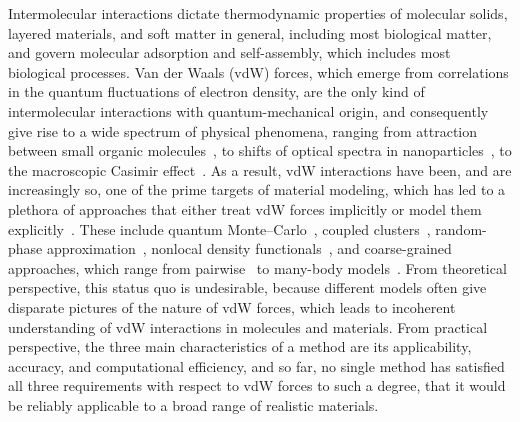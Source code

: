 Intermolecular interactions dictate thermodynamic properties of molecular solids, layered materials, and soft matter in general, including most biological matter, and govern molecular adsorption and self-assembly, which includes most biological processes.
Van der Waals (vdW) forces, which emerge from correlations in the quantum fluctuations of electron density, are the only kind of intermolecular interactions with quantum-mechanical origin, and consequently give rise to a wide spectrum of physical phenomena, ranging from attraction between small organic molecules~\citep{LondonZP30}, to shifts of optical spectra in nanoparticles~\citep{LuoP14}, to the macroscopic Casimir effect~\citep{JaffePRD05}.
As a result, vdW interactions have been, and are increasingly so, one of the prime targets of material modeling, which has led to a plethora of approaches that either treat vdW forces implicitly or model them explicitly~\citep{KlimesJCP12,HermannCR17}.
These include quantum Monte--Carlo~\citep{AmbrosettiJPCL14}, coupled clusters~\citep{YangS14}, random-phase approximation~\citep{LuPRL09}, nonlocal density functionals~\citep{DionPRL04,VydrovPRL09}, and coarse-grained approaches, which range from pairwise~\citep{GrimmeJCC04,BeckeJCP07,TkatchenkoPRL09} to many-body models~\citep{TkatchenkoPRL12,SilvestrelliJCP13}.
From theoretical perspective, this status quo is undesirable, because different models often give disparate pictures of the nature of vdW forces, which leads to incoherent understanding of vdW interactions in molecules and materials.
From practical perspective, the three main characteristics of a method are its applicability, accuracy, and computational efficiency, and so far, no single method has satisfied all three requirements with respect to vdW forces to such a degree, that it would be reliably applicable to a broad range of realistic materials.

